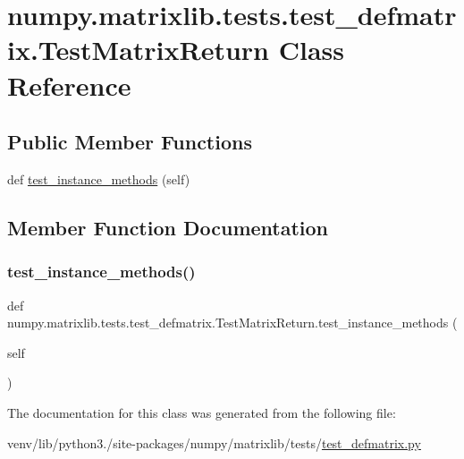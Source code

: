 \hypertarget{classnumpy_1_1matrixlib_1_1tests_1_1test__defmatrix_1_1TestMatrixReturn}{}\section{numpy.\+matrixlib.\+tests.\+test\+\_\+defmatrix.\+Test\+Matrix\+Return Class Reference}
\label{classnumpy_1_1matrixlib_1_1tests_1_1test__defmatrix_1_1TestMatrixReturn}
\subsection*{Public Member Functions}
\begin{DoxyCompactItemize}
\item 
def \hyperlink{classnumpy_1_1matrixlib_1_1tests_1_1test__defmatrix_1_1TestMatrixReturn_abc73b111e57b92118b292d472a4769d4}{test\+\_\+instance\+\_\+methods} (self)
\end{DoxyCompactItemize}


\subsection{Member Function Documentation}
\mbox{\label{classnumpy_1_1matrixlib_1_1tests_1_1test__defmatrix_1_1TestMatrixReturn_abc73b111e57b92118b292d472a4769d4}} 
\subsubsection{\texorpdfstring{test\+\_\+instance\+\_\+methods()}{test\_instance\_methods()}}
{\footnotesize\ttfamily def numpy.\+matrixlib.\+tests.\+test\+\_\+defmatrix.\+Test\+Matrix\+Return.\+test\+\_\+instance\+\_\+methods (\begin{DoxyParamCaption}\item[{}]{self }\end{DoxyParamCaption})}



The documentation for this class was generated from the following file\+:\begin{DoxyCompactItemize}
\item 
venv/lib/python3./site-\/packages/numpy/matrixlib/tests/\hyperlink{test__defmatrix_8py}{test\+\_\+defmatrix.\+py}\end{DoxyCompactItemize}
